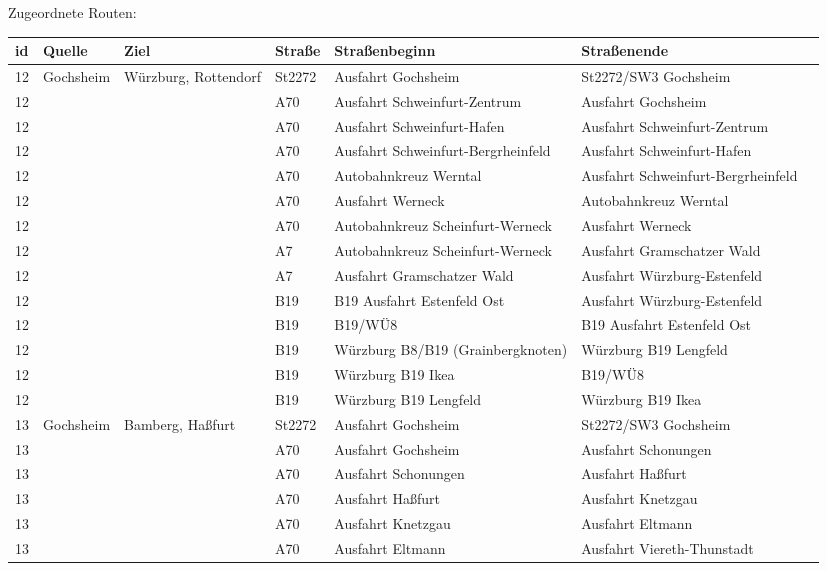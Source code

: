 Zugeordnete Routen:
\newline
\newline
\begin{tabular}{|l|l|l|l|l|l|l|}
    \hline
    id & Quelle & Ziel & Straße & Straßenbeginn & Straßenende\\ 
    \hline
    12 & Gochsheim & Würzburg, Rottendorf & St2272 & Ausfahrt Gochsheim & St2272/SW3 Gochsheim\\ 
    12 &  &  & A70 & Ausfahrt Schweinfurt-Zentrum & Ausfahrt Gochsheim\\ 
    12 &  &  & A70 & Ausfahrt Schweinfurt-Hafen & Ausfahrt Schweinfurt-Zentrum\\ 
    12 &  &  & A70 & Ausfahrt Schweinfurt-Bergrheinfeld & Ausfahrt Schweinfurt-Hafen\\ 
    12 &  &  & A70 & Autobahnkreuz Werntal & Ausfahrt Schweinfurt-Bergrheinfeld\\ 
    12 &  &  & A70 & Ausfahrt Werneck & Autobahnkreuz Werntal\\ 
    12 &  &  & A70 & Autobahnkreuz Scheinfurt-Werneck & Ausfahrt Werneck\\ 
    12 &  &  & A7 & Autobahnkreuz Scheinfurt-Werneck & Ausfahrt Gramschatzer Wald\\ 
    12 &  &  & A7 & Ausfahrt Gramschatzer Wald & Ausfahrt Würzburg-Estenfeld\\ 
    12 &  &  & B19 & B19 Ausfahrt Estenfeld Ost & Ausfahrt Würzburg-Estenfeld\\ 
    12 &  &  & B19 & B19/WÜ8 & B19 Ausfahrt Estenfeld Ost\\ 
    12 &  &  & B19 & Würzburg B8/B19 (Grainbergknoten) & Würzburg B19 Lengfeld\\ 
    12 &  &  & B19 & Würzburg B19 Ikea & B19/WÜ8\\ 
    12 &  &  & B19 & Würzburg B19 Lengfeld & Würzburg B19 Ikea\\ 
    \hline
    13 & Gochsheim & Bamberg, Haßfurt & St2272 & Ausfahrt Gochsheim & St2272/SW3 Gochsheim\\ 
    13 &  &  & A70 & Ausfahrt Gochsheim & Ausfahrt Schonungen\\ 
    13 &  &  & A70 & Ausfahrt Schonungen & Ausfahrt Haßfurt\\ 
    13 &  &  & A70 & Ausfahrt Haßfurt & Ausfahrt Knetzgau\\ 
    13 &  &  & A70 & Ausfahrt Knetzgau & Ausfahrt Eltmann\\ 
    13 &  &  & A70 & Ausfahrt Eltmann & Ausfahrt Viereth-Thunstadt\\ 

\end{tabular}
